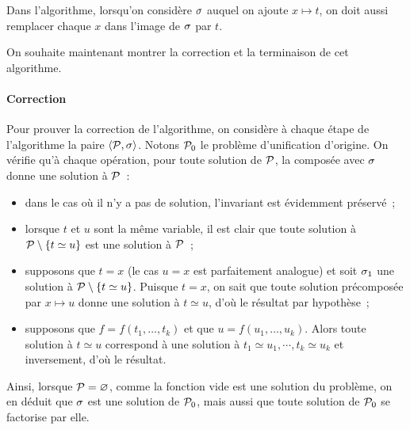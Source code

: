 \begin{remark}
  Dans l'algorithme, lorsqu'on considère $\sigma$ auquel on ajoute
  $x \mapsto t$, on doit aussi remplacer chaque $x$ dans l'image de
  $\sigma$ par $t$.
\end{remark}

On souhaite maintenant montrer la correction et la terminaison de cet
algorithme.

\paragraph{Correction}
Pour prouver la correction de l'algorithme, on considère à chaque
étape de l'algorithme la paire $\langle \mathcal{P},\sigma\rangle$.
Notons $\mathcal{P}_0$ le problème d'unification d'origine.
On vérifie qu'à chaque opération, pour toute solution de $\mathcal{P}$,
la composée avec $\sigma$ donne une solution à $\mathcal{P}$~:
\begin{itemize}
\item dans le cas où il n'y a pas de solution, l'invariant est
  évidemment préservé~;
\item lorsque $t$ et $u$ sont la même variable, il est clair que
  toute solution à $\mathcal{P}\setminus \{t\simeq u\}$ est une
  solution à $\mathcal{P}$~;
\item supposons que $t = x$ (le cas $u = x$ est parfaitement
  analogue) et soit $\sigma_1$ une solution à
  $\mathcal{P}\setminus\{t\simeq u\}$. Puisque $t = x$, on sait
  que toute solution précomposée par $x \mapsto u$ donne
  une solution à $t \simeq u$, d'où le résultat par hypothèse~;
\item supposons que $f = f(t_1,\ldots,t_k)$ et que
  $u = f(u_1,\ldots,u_k)$. Alors toute solution à
  $t \simeq u$ correspond à une solution à
  $t_1 \simeq u_1,\cdots, t_k \simeq u_k$ et inversement, d'où
  le résultat.
\end{itemize}
Ainsi, lorsque $\mathcal{P} = \varnothing$, comme la fonction vide est
une solution du problème, on en déduit que $\sigma$ est une
solution de $\mathcal{P}_0$, mais aussi que toute solution de
$\mathcal{P}_0$ se factorise par elle.

